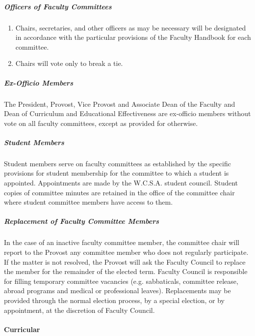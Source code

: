 \documentclass[letterpaper, 11pt]{article}
\begin{document}
				\subparagraph{Officers of Faculty Committees}
					\begin{enumerate}[label=\alph*)]
						\item{Chairs, secretaries, and other officers as may be necessary will be designated in accordance with the particular provisions of the Faculty Handbook for each committee.}
						\item{Chairs will vote only to break a tie.}
					\end{enumerate}
				\subparagraph{Ex-Officio Members}
					The President, Provost, Vice Provost and Associate Dean of the Faculty and Dean of Curriculum and Educational Effectiveness are ex-officio members without vote on all faculty committees, except as provided for otherwise.
				\subparagraph{Student Members}
					Student members serve on faculty committees as established by the specific provisions for student membership for the committee to which a student is appointed. Appointments are made by the W.C.S.A. student council.  Student copies of committee minutes are retained in the office of the committee chair where student committee members have access to them.
				\subparagraph{Replacement of Faculty Committee Members}

					In the case of an inactive faculty committee member, the committee chair will report to the Provost any committee member who does not regularly participate.  If the matter is not resolved, the Provost will ask the Faculty Council to replace the member for the remainder of the elected term.
					Faculty Council is responsible for filling temporary committee vacancies (e.g. sabbaticals, committee release, abroad programs and medical or professional leaves).  Replacements may be provided through the normal election process, by a special election, or by appointment, at the discretion of Faculty Council.
			\paragraph{Curricular}
\end{document}
